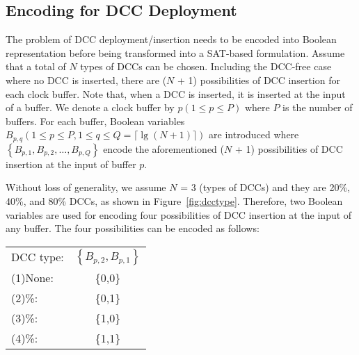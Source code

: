 \subsection{Encoding for DCC Deployment}
\label{subsec:eddcd}
The problem of DCC deployment/insertion needs to be encoded into Boolean representation before being transformed into a SAT-based formulation. Assume that a total of $N$ types of DCCs can be chosen. Including the DCC-free case where no DCC is inserted, there are ($N$ + 1) possibilities of DCC insertion for each clock buffer. Note that, when a DCC is inserted, it is inserted at the input of a buffer. We denote a clock buffer by $p\left(1 \leq p \leq P\right)$ where $P$ is the number of buffers. For each buffer, Boolean variables $B_{p,q}\left(1 \leq p \leq P, 1 \leq q \leq Q = \lceil \lg (N + 1)\rceil \right)$ are introduced where $\left\{B_{p,1}, B_{p,2},\dotsc, B_{p,Q}\right\}$ encode the aforementioned ($N$ + 1) possibilities of DCC insertion at the input of buffer $p$.

Without loss of generality, we assume $N$ = 3 (types of DCCs) and they are 20\%, 40\%, and 80\% DCCs, as shown in Figure~\ref{fig:dcctype}. Therefore, two Boolean variables are used for encoding four possibilities of DCC insertion at the input of any buffer. The four possibilities can be encoded as follows:

\begin{tabular}{ l c }
  DCC type: & $\left\{B_{p,2},B_{p,1}\right\}$ \\
  (1)\quad None: & \{0,0\} \\
  (2)\quad 20\%: &  \{0,1\} \\
  (3)\quad 40\%: &  \{1,0\} \\
  (4)\quad 80\%: &  \{1,1\} \\
\end{tabular}


